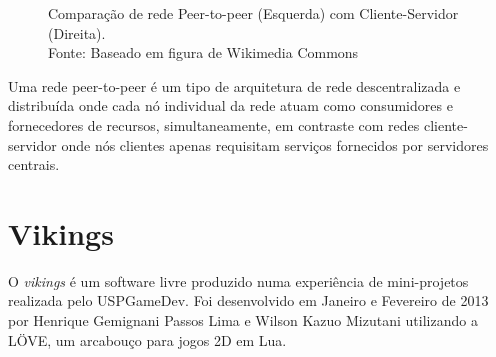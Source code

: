   \begin{figure}[h]
    \begin{centering}
    \caption{Comparação de rede Peer-to-peer (Esquerda) com Cliente-Servidor (Direita). \\
      Fonte: Baseado em figura de Wikimedia Commons}
    \end{centering}
  \end{figure}

  Uma rede peer-to-peer é um tipo de arquitetura de rede descentralizada e distribuída
  onde cada nó individual da rede atuam como consumidores e fornecedores de recursos,
  simultaneamente, em contraste com redes cliente-servidor onde nós clientes apenas
  requisitam serviços fornecidos por servidores centrais. \cite{peertopeer:definition}
  

\section{Vikings}
\label{sec:conceitos:vikings}
  O \textit{vikings}\footnotemark{} é um software livre produzido numa experiência de mini-projetos realizada pelo USPGameDev\footnotemark. 
  Foi desenvolvido em Janeiro e Fevereiro de 2013 por Henrique Gemignani Passos Lima e Wilson Kazuo Mizutani 
  utilizando a LÖVE, um arcabouço para jogos 2D em Lua\footnotemark{}.
  
